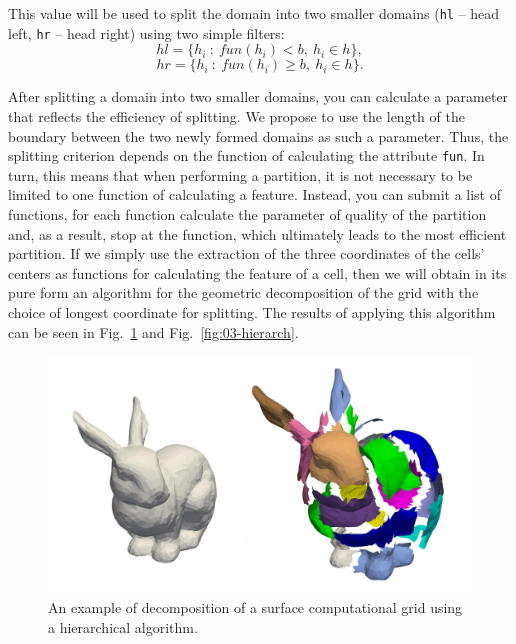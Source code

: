 \documentclass[
11pt,%
tightenlines,%
twoside,%
onecolumn,%
nofloats,%
nobibnotes,%
nofootinbib,%
superscriptaddress,%
noshowpacs,%
centertags]%
{revtex4}
\begin{document}
This value will be used to split the domain into two smaller domains (\texttt{hl} -- head left, \texttt{hr} -- head right) using two simple filters:
\begin{equation*}
	hl = \{h_i~:~fun(h_i) < b,~h_i \in h\},
\end{equation*}
\begin{equation*}
	hr = \{h_i~:~fun(h_i) \geq b,~h_i \in h\}.
\end{equation*}

After splitting a domain into two smaller domains, you can calculate a parameter that reflects the efficiency of splitting.
We propose to use the length of the boundary between the two newly formed domains as such a parameter.
Thus, the splitting criterion depends on the function of calculating the attribute \texttt{fun}.
In turn, this means that when performing a partition, it is not necessary to be limited to one function of calculating a feature.
Instead, you can submit a list of functions, for each function calculate the parameter of quality of the partition and, as a result, stop at the function, which ultimately leads to the most efficient partition.
If we simply use the extraction of the three coordinates of the cells' centers as functions for calculating the feature of a cell, then we will obtain in its pure form an algorithm for the geometric decomposition of the grid with the choice of longest coordinate for splitting.
The results of applying this algorithm can be seen in Fig.~\ref{fig:03-explode-bunny} and Fig.~\ref{fig:03-hierarch}.

\begin{figure}[h]
\includegraphics[width=1.0\textwidth]{pics/03-explode-bunny.pdf}
\caption{An example of decomposition of a surface computational grid using a hierarchical algorithm.}\label{fig:03-explode-bunny}
\end{figure}
\end{document}
